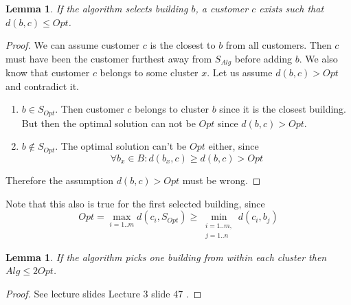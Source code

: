 \documentclass{article}
\newtheorem{lemma}[theorem]{Lemma}
\begin{document}
\begin{lemma}\label{lma:BuildingCustomer}
    If the algorithm selects building $b$, a customer $c$ exists such that $d(b,c) \leq Opt$.
\end{lemma}
\begin{proof}
    We can assume customer $c$ is the closest to $b$ from all customers. Then $c$ must have been the customer furthest away from $S_{Alg}$ before adding $b$. We also know that customer $c$ belongs to some cluster $x$. Let us assume $d(b,c) > Opt$ and contradict it.
    \begin{enumerate}[label=\textbf{Case \arabic*:}, left=0pt, itemindent=*, labelindent=1em]
        \item $b \in S_{Opt}$. Then customer $c$ belongs to cluster $b$ since it is the closest building. But then the optimal solution can not be $Opt$ since $d(b,c) > Opt$.
        \item $b \notin S_{Opt}$. The optimal solution can't be $Opt$ either, since $$\forall b_x\in B:d(b_x,c) \geq d(b,c) > Opt$$
    \end{enumerate}
    Therefore the assumption $d(b,c)>Opt$ must be wrong.
\end{proof}
Note that this also is true for the first selected building, since $$Opt = \max_{i=1..m} d(c_i,S_{Opt}) \geq \min_{\substack{i=1..m,\\j=1..n}} d(c_i, b_j)$$

\begin{lemma}\label{lma:onePerCluster}
    If the algorithm picks one building from within each cluster then $Alg \leq 2 Opt$.
\end{lemma}
\begin{proof}
    See lecture slides Lecture 3 slide 47 \cite{Lecture3}.
\end{proof}
\end{document}
